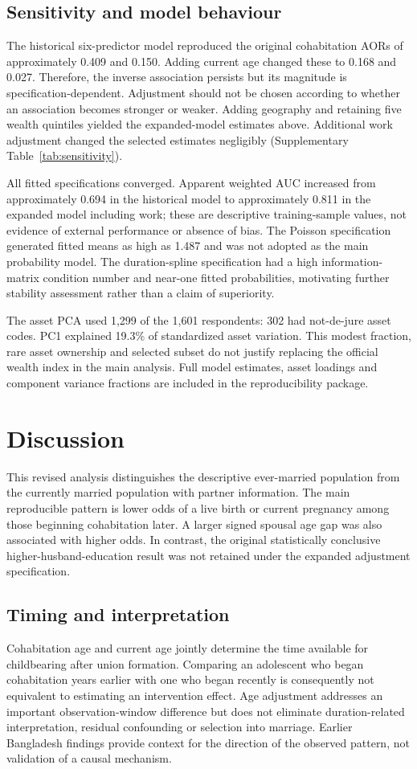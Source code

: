 \documentclass[11pt]{article}
\begin{document}
\subsection{Sensitivity and model behaviour}
The historical six-predictor model reproduced the original cohabitation AORs of approximately 0.409 and 0.150. Adding current age changed these to 0.168 and 0.027. Therefore, the inverse association persists but its magnitude is specification-dependent. Adjustment should not be chosen according to whether an association becomes stronger or weaker. Adding geography and retaining five wealth quintiles yielded the expanded-model estimates above. Additional work adjustment changed the selected estimates negligibly (Supplementary Table~\ref{tab:sensitivity}).

All fitted specifications converged. Apparent weighted AUC increased from approximately 0.694 in the historical model to approximately 0.811 in the expanded model including work; these are descriptive training-sample values, not evidence of external performance or absence of bias. The Poisson specification generated fitted means as high as 1.487 and was not adopted as the main probability model. The duration-spline specification had a high information-matrix condition number and near-one fitted probabilities, motivating further stability assessment rather than a claim of superiority.

The asset PCA used 1,299 of the 1,601 respondents: 302 had not-de-jure asset codes. PC1 explained 19.3\% of standardized asset variation. This modest fraction, rare asset ownership and selected subset do not justify replacing the official wealth index in the main analysis. Full model estimates, asset loadings and component variance fractions are included in the reproducibility package.

\section{Discussion}
This revised analysis distinguishes the descriptive ever-married population from the currently married population with partner information. The main reproducible pattern is lower odds of a live birth or current pregnancy among those beginning cohabitation later. A larger signed spousal age gap was also associated with higher odds. In contrast, the original statistically conclusive higher-husband-education result was not retained under the expanded adjustment specification.

\subsection{Timing and interpretation}
Cohabitation age and current age jointly determine the time available for childbearing after union formation. Comparing an adolescent who began cohabitation years earlier with one who began recently is consequently not equivalent to estimating an intervention effect. Age adjustment addresses an important observation-window difference but does not eliminate duration-related interpretation, residual confounding or selection into marriage. Earlier Bangladesh findings provide context for the direction of the observed pattern, not validation of a causal mechanism.\cite{alam,islam}
\end{document}
